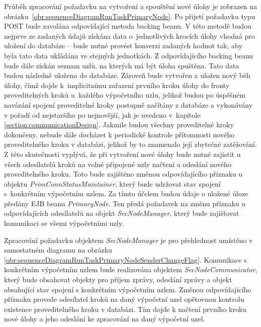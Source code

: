 Průběh zpracování požadavku na vytvoření a spouštění nové úlohy je zobrazen na obrázku~\ref{obr:sequenceDiagramRunTaskPrimaryNode}. Po přijetí požadavku typu POST bude zavolána odpovídající metoda backing beanu. V této metodě budou nejprve ze zadaných údajů získána data o~jednotlivých krocích úlohy vhodná pro uložení do databáze -- bude nutné provést konverzi zadaných hodnot tak, aby byla tato data ukládána ve stejných jednotkách. Z odpovídajícího backing beanu bude dále získán seznam uzlů, na kterých má být úloha spuštěna. Tato data budou následně uložena do databáze. Zároveň bude vytvořen a uložen nový běh úlohy, čímž dojde k~implicitnímu zařazení prvního kroku úlohy do fronty proveditelných kroků u~každého výpočetního uzlu, jelikož budou po úspěšném navázání spojení proveditelné kroky postupně načítány z databáze a vykonávány v pořadí od nejstaršího po nejnovější, jak je uvedeno v~kapitole \ref{section:communicationDesign}. Jakmile budou všechny proveditelné kroky dokončeny, nebude dále docházet k periodické kontrole přítomnosti nového proveditelného kroku v databázi, jelikož by to znamenalo její zbytečné zatěžování. Z této skutečnosti vyplývá, že při vytvoření nové úlohy bude nutné zajistit u všech odesílatelů kroků na volné připojené uzly načtení a odeslání nového proveditelného kroku. Toto bude zajištěno změnou odpovídajícího příznaku u objektu \textit{PrimConnStatusMaintainer}, který bude udržovat stav spojení s~konkrétním výpočetním uzlem. Za tímto účelem budou údaje o uložené úloze předány EJB beanu \textit{PrimaryNode}. Ten předá požadavek na změnu příznaku u odpovídajících odesílatelů na objekt \textit{SecNodeManager}, který bude zajišťovat komunikaci se všemi výpočetními uzly. 

Zpracování požadavku objektem \textit{SecNodeManager} je pro přehlednost umístěno v samostatném diagramu na obrázku \ref{obr:sequenceDiagramRunTaskPrimaryNodeSenderChangeFlag}. Komunikace s konkrétním výpočetním uzlem bude realizována objektem \textit{SecNodeCommunicator}, který bude obsahovat objekty pro příjem zprávy, odeslání zprávy a objekt obsahující stav spojení s konkrétním výpočetním uzlem. Změnou odpovídajícího příznaku provede odesílatel kroků na daný výpočetní uzel opětovnou kontrolu existence proveditelného kroku v databázi. Tím dojde k načtení prvního kroku nové úlohy a jeho odeslání ke zpracování na daný výpočetní uzel.

